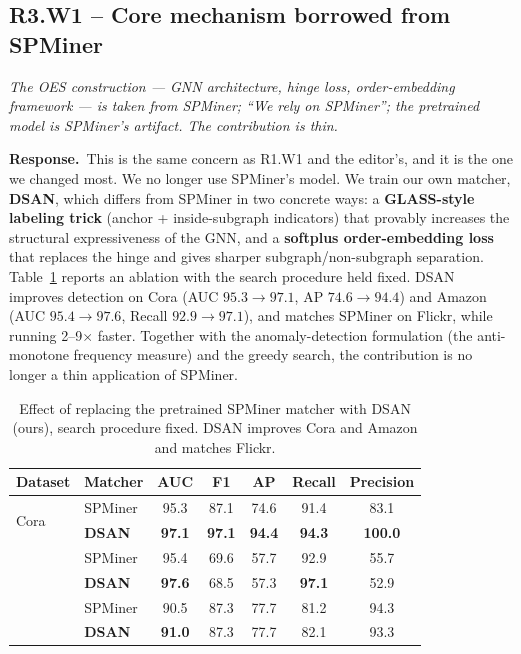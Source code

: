 \documentclass[11pt]{article}
\newcommand{\comment}[1]{\begin{reviewerbox}\itshape #1\end{reviewerbox}}
\newcommand{\response}{\par\noindent\textbf{\textcolor{respgreen}{Response.}}\ }
\begin{document}
\subsection*{R3.W1 -- Core mechanism borrowed from SPMiner}
\comment{The OES construction --- GNN architecture, hinge loss, order-embedding framework --- is taken from SPMiner; ``We rely on SPMiner''; the pretrained model is SPMiner's artifact. The contribution is thin.}
\response This is the same concern as R1.W1 and the editor's, and it is the one we changed most. We no longer use SPMiner's model. We train our own matcher, \textbf{DSAN}, which differs from SPMiner in two concrete ways: a \textbf{GLASS-style labeling trick} (anchor + inside-subgraph indicators) that provably increases the structural expressiveness of the GNN, and a \textbf{softplus order-embedding loss} that replaces the hinge and gives sharper subgraph/non-subgraph separation. Table~\ref{tab:dsan_vs_spminer_resp} reports an ablation with the search procedure held fixed. DSAN improves detection on Cora (AUC $95.3\rightarrow97.1$, AP $74.6\rightarrow94.4$) and Amazon (AUC $95.4\rightarrow97.6$, Recall $92.9\rightarrow97.1$), and matches SPMiner on Flickr, while running 2--9$\times$ faster. Together with the anomaly-detection formulation (the anti-monotone frequency measure) and the greedy search, the contribution is no longer a thin application of SPMiner.

\begin{table}[h]
\footnotesize
\centering
\caption{Effect of replacing the pretrained SPMiner matcher with DSAN (ours), search procedure fixed. DSAN improves Cora and Amazon and matches Flickr.}
\label{tab:dsan_vs_spminer_resp}
\begin{tabular}{llccccc}
\toprule
\textbf{Dataset} & \textbf{Matcher} & \textbf{AUC} & \textbf{F1} & \textbf{AP} & \textbf{Recall} & \textbf{Precision} \\
\midrule
\multirow{2}{*}{Cora}   & SPMiner          & 95.3 & 87.1 & 74.6 & 91.4 & 83.1 \\
                         & \textbf{DSAN}    & \textbf{97.1} & \textbf{97.1} & \textbf{94.4} & \textbf{94.3} & \textbf{100.0} \\
\addlinespace
\multirow{2}{*}{Amazon}  & SPMiner          & 95.4 & 69.6 & 57.7 & 92.9 & 55.7 \\
                         & \textbf{DSAN}    & \textbf{97.6} & 68.5 & 57.3 & \textbf{97.1} & 52.9 \\
\addlinespace
\multirow{2}{*}{Flickr}  & SPMiner          & 90.5 & 87.3 & 77.7 & 81.2 & 94.3 \\
                         & \textbf{DSAN}    & \textbf{91.0} & 87.3 & 77.7 & 82.1 & 93.3 \\
\bottomrule
\end{tabular}
\end{table}
\end{document}
